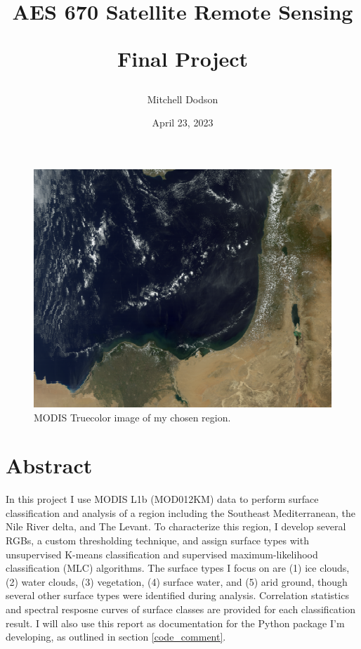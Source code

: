 \documentclass[12pt]{article}
\title{AES 670 Satellite Remote Sensing

Final Project}
\author{Mitchell Dodson}
\date{April 23, 2023}
\begin{document}
\maketitle

\begin{figure}[h!]
    \centering
    \includegraphics[width=.6\paperwidth]{figs/rgbs/rgb_TC.png}
    \caption{MODIS Truecolor image of my chosen region.}
    \label{title_image}
\end{figure}

\section{Abstract}

In this project I use MODIS L1b (MOD012KM) data to perform surface classification and analysis of a region including the Southeast Mediterranean, the Nile River delta, and The Levant. To characterize this region, I develop several RGBs, a custom thresholding technique, and assign surface types with unsupervised K-means classification and supervised maximum-likelihood classification (MLC) algorithms. The surface types I focus on are (1) ice clouds, (2) water clouds, (3) vegetation, (4) surface water, and (5) arid ground, though several other surface types were identified during analysis. Correlation statistics and spectral resposne curves of surface classes are provided for each classification result.  I will also use this report as documentation for the Python package I'm developing, as outlined in section \ref{code_comment}.
\end{document}
